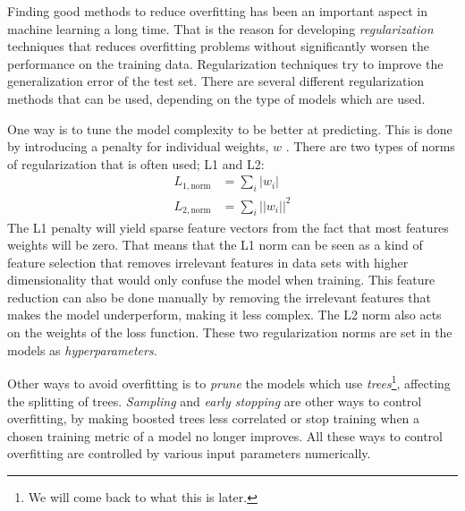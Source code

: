 \documentclass[a4paper, american, 12pt]{report}
\begin{document}
	Finding good methods to reduce overfitting has been an important aspect in machine learning a long time. That is the reason for developing \textit{regularization} techniques that reduces overfitting problems without significantly worsen the performance on the training data. Regularization techniques try to improve the generalization error of the test set. There are several different regularization methods that can be used, depending on the type of models which are used.
	
	One way is to tune the model complexity to be better at predicting. This is done by introducing a penalty for individual weights, $w$ . There are two types of norms of regularization that is often used; L1 and L2:
	\begin{align}
	\label{eq:L1Reg}
		L_{1,\text{norm}}&=\sum_{i}|w_i|\\
	\label{eq:L2Reg}
		L_{2,\text{norm}}&=\sum_{i}||w_i||^2
	\end{align}
	The L1 penalty will yield sparse feature vectors from the fact that most features weights will be zero. That means that the L1 norm can be seen as a kind of feature selection that removes irrelevant features in data sets with higher dimensionality that would only confuse the model when training. This feature reduction can also be done manually by removing the irrelevant features that makes the model underperform, making it less complex. The L2 norm also acts on the weights of the loss function. These two regularization norms are set in the models as \textit{hyperparameters}.
	
	Other ways to avoid overfitting is to \textit{prune} the models which use \textit{trees}\footnote{We will come back to what this is later.}, affecting the splitting of trees. \textit{Sampling} and \textit{early stopping} are other ways to control overfitting, by making boosted trees less correlated or stop training when a chosen training metric of a model no longer improves. All these ways to control overfitting are controlled by various input parameters numerically.
	
	
\end{document}
